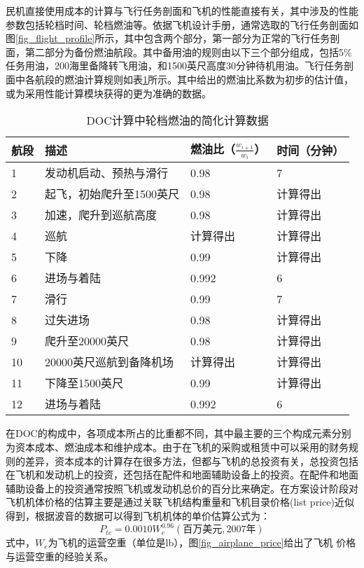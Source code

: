 民机直接使用成本的计算与飞行任务剖面和飞机的性能直接有关，其中涉及的性能参数包括轮档时间、轮档燃油等。依据飞机设计手册，通常选取的飞行任务剖面如图\ref{fig_flight_profile}所示，其中包含两个部分，第一部分为正常的飞行任务剖面，第二部分为备份燃油航段。其中备用油的规则由以下三个部分组成，包括5\%任务用油，200海里备降转飞用油，和1500英尺高度30分钟待机用油。飞行任务剖面中各航段的燃油计算规则如表\ref{table_fortoc}所示。其中给出的燃油比系数为初步的估计值，或为采用性能计算模块获得的更为准确的数据。

\begin{table}
\centering \caption{DOC计算中轮档燃油的简化计算数据}
\label{table_fortoc}     %
\begin{tabular}{p{}p{}p{}p{}}
\hline \hline 航段 & 描述 & 燃油比（$\frac{w_{i+1}}{w_i}$）& 时间（分钟） \\
\hline 1&发动机启动、预热与滑行 &0.98 &7 \\
2&起飞，初始爬升至1500英尺 &0.98 & 计算得出 \\
3&加速，爬升到巡航高度 &0.98 & 计算得出\\
4&巡航 &计算得出&计算得出 \\
5&下降 &0.99 & 计算得出 \\
6&进场与着陆 &0.992& 6\\
7&滑行  &0.99 &7 \\
\hline
8&过失进场 &0.98 & 计算得出\\
9&爬升至20000英尺 &0.98 & 计算得出　 \\
10& 20000英尺巡航到备降机场 &计算得出&计算得出 \\
11&下降至1500英尺 &0.99 &计算得出 \\
12&进场与着陆 &0.992& 6\\
\hline \hline
\end{tabular}
\end{table}

在DOC的构成中，各项成本所占的比重都不同，其中最主要的三个构成元素分别为资本成本、燃油成本和维护成本。由于在飞机的采购或租赁中可以采用的财务规则的差异，资本成本的计算存在很多方法，但都与飞机的总投资有关，总投资包括在飞机和发动机上的投资，还包括在配件和地面辅助设备上的投资。在配件和地面辅助设备上的投资通常按照飞机或发动机总价的百分比来确定。在方案设计阶段对飞机机体价格的估算主要是通过关联飞机结构重量和飞机目录价格(list price)近似得到，根据波音的数据可以得到飞机机体的单价估算公式为：
\begin{equation}
\label{eq_boeingprice} P_{tc}=0.0010W_{e}^{0.96}
(\mbox{百万美元},2007\mbox{年})
\end{equation}
式中，$W_e$为飞机的运营空重（单位是lb），图\ref{fig_airplane_price}给出了飞机%
价格与运营空重的经验关系。



